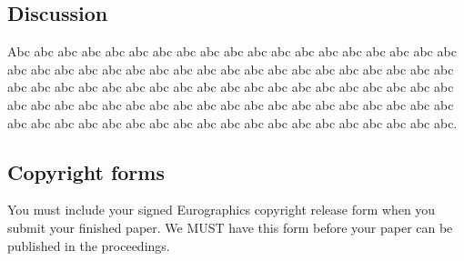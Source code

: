 \documentclass{egpubl}
\begin{document}
\subsection{Discussion}

   Abc abc abc abc abc abc abc abc abc abc abc abc abc abc abc abc abc abc abc abc abc abc abc abc abc abc abc abc abc abc abc abc abc abc abc abc abc abc abc abc abc abc abc abc abc abc abc abc abc abc abc abc abc abc abc abc abc abc abc abc abc abc abc abc abc abc abc abc abc abc abc abc abc abc abc abc abc abc abc abc abc abc abc abc abc abc abc abc abc abc abc abc abc abc abc.

\subsection{Copyright forms}

You must include your signed Eurographics copyright release form
when you submit your finished paper. We MUST have this form before
your paper can be published in the proceedings.





\end{document}

